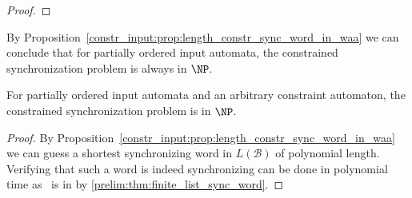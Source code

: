\begin{proof}
%	
\end{proof}

By Proposition~\ref{constr_input:prop:length_constr_sync_word_in_waa} we can conclude that
for partially ordered input automata, the constrained synchronization problem is always in $\NP$.

\begin{theorem}
	\label{thm:constraint_sync_weakly_acyclic_in_NP}
	For partially ordered input automata and an arbitrary constraint automaton,
	the constrained synchronization problem	is in $\NP$.
\end{theorem}
\begin{proof}
	By Proposition~\ref{constr_input:prop:length_constr_sync_word_in_waa} we can guess a shortest synchronizing word in $L(\mathcal B)$
	of polynomial length.
	Verifying that such a word is indeed synchronizing can be done in polynomial time as \DFASW\ 
	is in \LOGSPACE by \cref{prelim:thm:finite_list_sync_word}.	
\end{proof}

